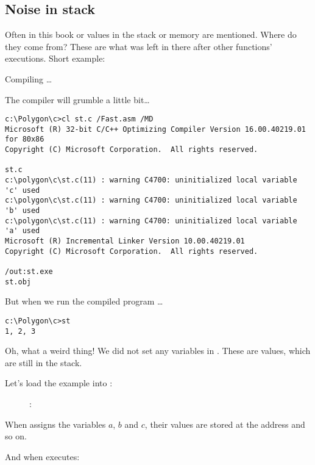 \subsection{Noise in stack}

Often in this book  or  values in the stack or memory are mentioned.
Where do they come from?
These are what was left in there after other functions' executions.
Short example:



Compiling \dots



The compiler will grumble a little bit\dots

\begin{lstlisting}
c:\Polygon\c>cl st.c /Fast.asm /MD
Microsoft (R) 32-bit C/C++ Optimizing Compiler Version 16.00.40219.01 for 80x86
Copyright (C) Microsoft Corporation.  All rights reserved.

st.c
c:\polygon\c\st.c(11) : warning C4700: uninitialized local variable 'c' used
c:\polygon\c\st.c(11) : warning C4700: uninitialized local variable 'b' used
c:\polygon\c\st.c(11) : warning C4700: uninitialized local variable 'a' used
Microsoft (R) Incremental Linker Version 10.00.40219.01
Copyright (C) Microsoft Corporation.  All rights reserved.

/out:st.exe
st.obj
\end{lstlisting}

But when we run the compiled program \dots

\begin{lstlisting}
c:\Polygon\c>st
1, 2, 3
\end{lstlisting}

Oh, what a weird thing! We did not set any variables in . 
These are  values, which are still in the stack.

\clearpage
Let's load the example into \olly:

\begin{figure}[H]
\centering
{}
\caption{\olly: }
\label{fig:stack_noise_olly1}
\end{figure}

When  assigns the variables $a$, $b$ and $c$, their values are stored at the address  and so on.

\clearpage
And when  executes:

